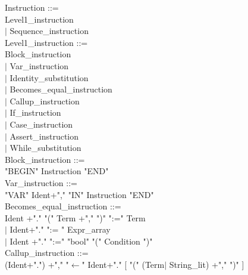 \documentclass[12pt,a4paper,draft]{article}
\begin{document}
{\begin{sloppypar}
 
\noindent Instruction ::= \\
\hspace*{0.20in}Level1\_instruction\\
\hspace*{0.20in} $|$  Sequence\_instruction\\
Level1\_instruction ::= \\
\hspace*{0.20in}Block\_instruction\\
\hspace*{0.20in} $|$  Var\_instruction\\
\hspace*{0.20in} $|$  Identity\_substitution\\
\hspace*{0.20in} $|$  Becomes\_equal\_instruction\\
\hspace*{0.20in} $|$  Callup\_instruction\\
\hspace*{0.20in} $|$  If\_instruction\\
\hspace*{0.20in} $|$ Case\_instruction\\ 
\hspace*{0.20in} $|$  Assert\_instruction\\
\hspace*{0.20in} $|$  While\_substitution\\
Block\_instruction ::= \\
\hspace*{0.20in}  "BEGIN"  Instruction  "END" \\
Var\_instruction ::= \\
\hspace*{0.20in}"VAR"  Ident+","  "IN"  Instruction  "END" \\
Becomes\_equal\_instruction ::= \\
\hspace*{0.20in}  Ident +"."  "(" Term +","  ")"  ":="  Term  \\   %
\hspace*{0.20in} $|$ Ident+"."  ":= " Expr\_array  \\
\hspace*{0.20in} $|$ Ident +"."   ":="  "bool" "(" Condition ")" \\
Callup\_instruction ::= \\
\hspace*{0.20in}  (Ident+".") +","  "$\leftarrow$"  Ident+"."  [ "(" (Term$|$ String\_lit) +","  ")" ] \\ %

\end{sloppypar}}
\end{document}
